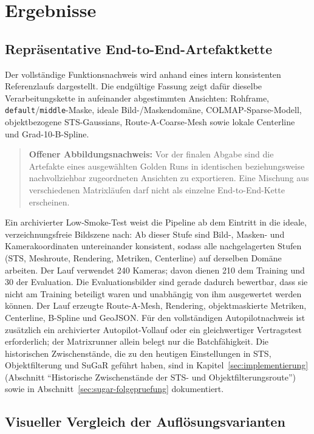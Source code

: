 \section{Ergebnisse}

\subsection{Repräsentative End-to-End-Artefaktkette}

Der vollständige Funktionsnachweis wird anhand eines intern konsistenten
Referenzlaufs dargestellt. Die endgültige Fassung zeigt dafür dieselbe
Verarbeitungskette in aufeinander abgestimmten Ansichten: Rohframe,
\texttt{default}/\texttt{middle}-Maske, ideale Bild-/Maskendomäne,
COLMAP-Sparse-Modell, objektbezogene STS-Gaussians, Route-A-Coarse-Mesh sowie
lokale Centerline und Grad-10-B-Spline.

\begin{quote}
\textbf{Offener Abbildungsnachweis:} Vor der finalen Abgabe sind die
Artefakte eines ausgewählten Golden Runs in identischen beziehungsweise
nachvollziehbar zugeordneten Ansichten zu exportieren. Eine Mischung aus
verschiedenen Matrixläufen darf nicht als einzelne End-to-End-Kette erscheinen.
\end{quote}

Ein archivierter Low-Smoke-Test weist die Pipeline ab dem Eintritt in die
ideale, verzeichnungsfreie Bildszene nach: Ab dieser Stufe sind Bild-, Masken-
und Kamerakoordinaten untereinander konsistent, sodass alle nachgelagerten
Stufen (STS, Meshroute, Rendering, Metriken, Centerline) auf derselben Domäne
arbeiten. Der Lauf verwendet 240 Kameras; davon dienen 210 dem Training und 30
der Evaluation. Die Evaluationsbilder sind gerade dadurch bewertbar, dass sie
nicht am Training beteiligt waren und unabhängig von ihm ausgewertet werden
können. Der Lauf erzeugte Route-A-Mesh, Rendering, objektmaskierte Metriken,
Centerline, B-Spline und GeoJSON. Für den vollständigen Autopilotnachweis ist
zusätzlich ein archivierter Autopilot-Vollauf oder ein gleichwertiger
Vertragstest erforderlich; der Matrixrunner allein belegt nur die
Batchfähigkeit. Die historischen Zwischenstände, die zu den heutigen
Einstellungen in STS, Objektfilterung und SuGaR geführt haben, sind in
Kapitel~\ref{sec:implementierung} (Abschnitt
``Historische Zwischenstände der STS- und Objektfilterungsroute'') sowie in
Abschnitt~\ref{sec:sugar-folgepruefung} dokumentiert.

\subsection{Visueller Vergleich der Auflösungsvarianten}
\label{sec:visueller-aufloesungsvergleich}

